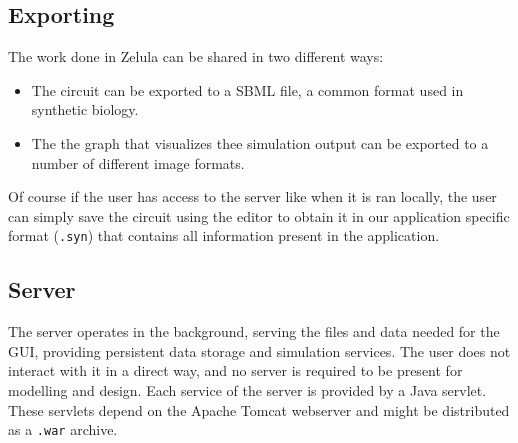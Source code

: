 \pagebreak
\subsection{Exporting}
The work done in Zelula can be shared in two different ways:
\begin{itemize}
	\item The circuit can be exported to a SBML file, a common format used in synthetic biology.
	\item The the graph that visualizes thee simulation output can be exported to a number of different image formats.
\end{itemize}

Of course if the user has access to the server like when it is ran locally, the user can simply save the circuit using the editor to obtain it in our application specific format (\verb=.syn=) that contains all information present in the application.

\subsection{Server}
The server operates in the background, serving the files and data needed for the GUI, providing persistent data storage and simulation services. The user does not interact with it in a direct way, and no server is required to be present for modelling and design. Each service of the server is provided by a Java servlet. These servlets depend on the Apache Tomcat webserver and might be distributed as a \verb|.war| archive. 
